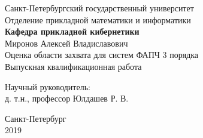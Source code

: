 \documentclass[a4paper,14pt]{extarticle} %
\begin{document}


 
\begin{center}
\hfill \break
\normalsize{Санкт-Петербургский государственный университет}\\ 
\hfill \break
\normalsize{Отделение прикладной математики и информатики}\\
\normalsize{\textbf{Кафедра прикладной кибернетики}}\\
\hfill \break
\hfill \break 
\hfill \break
\hfill \break
\hfill\break
\hfill \break
\normalsize{Миронов Алексей Владиславович}\\
\hfill \break
\large{Оценка области захвата для систем ФАПЧ 3 порядка}\\
\hfill \break
\small{Выпускная квалификационная работа}\\
\hfill \break
\hfill \break
\hfill \break
\hfill \break
\hfill \break
\hfill \break
\hfill \break
\hfill \break
\end{center}
 
\hfill \break
\hfill \break
\hfill \break
 
 \small{
\begin{flushright}
Научный руководитель:\\
д. т.н., профессор Юлдашев Р. В.
\end{flushright}
}
\hfill \break
\hfill \break
\hfill \break
\hfill \break
\hfill \break
\hfill \break
\hfill \break
\hfill \break
\hfill \break
\hfill \break
\hfill \break
\hfill \break
\hfill \break
\begin{center} Санкт-Петербург \\
2019 \end{center}
\thispagestyle{empty} %

 \tableofcontents
\newpage
\end{document}
